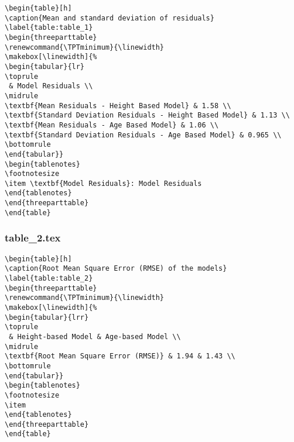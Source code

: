 \documentclass[11pt]{article}
\begin{document}
\begin{Verbatim}[tabsize=4]
\begin{table}[h]
\caption{Mean and standard deviation of residuals}
\label{table:table_1}
\begin{threeparttable}
\renewcommand{\TPTminimum}{\linewidth}
\makebox[\linewidth]{%
\begin{tabular}{lr}
\toprule
 & Model Residuals \\
\midrule
\textbf{Mean Residuals - Height Based Model} & 1.58 \\
\textbf{Standard Deviation Residuals - Height Based Model} & 1.13 \\
\textbf{Mean Residuals - Age Based Model} & 1.06 \\
\textbf{Standard Deviation Residuals - Age Based Model} & 0.965 \\
\bottomrule
\end{tabular}}
\begin{tablenotes}
\footnotesize
\item \textbf{Model Residuals}: Model Residuals
\end{tablenotes}
\end{threeparttable}
\end{table}

\end{Verbatim}

\subsubsection*{table\_2.tex}

\begin{Verbatim}[tabsize=4]
\begin{table}[h]
\caption{Root Mean Square Error (RMSE) of the models}
\label{table:table_2}
\begin{threeparttable}
\renewcommand{\TPTminimum}{\linewidth}
\makebox[\linewidth]{%
\begin{tabular}{lrr}
\toprule
 & Height-based Model & Age-based Model \\
\midrule
\textbf{Root Mean Square Error (RMSE)} & 1.94 & 1.43 \\
\bottomrule
\end{tabular}}
\begin{tablenotes}
\footnotesize
\item
\end{tablenotes}
\end{threeparttable}
\end{table}

\end{Verbatim}
\end{document}

